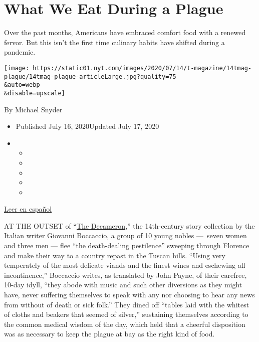 \hypertarget{what-we-eat-during-a-plague}{%
\section{What We Eat During a
Plague}\label{what-we-eat-during-a-plague}}

Over the past months, Americans have embraced comfort food with a
renewed fervor. But this isn't the first time culinary habits have
shifted during a pandemic.

\texttt{[image: https://static01.nyt.com/images/2020/07/14/t-magazine/14tmag-plague/14tmag-plague-articleLarge.jpg?quality=75\\\&auto=webp\\\&disable=upscale]}

By Michael Snyder

\begin{itemize}
\item
  Published July 16, 2020Updated July 17, 2020
\item
  \begin{itemize}
  \item
  \item
  \item
  \item
  \item
  \end{itemize}
\end{itemize}

\href{https://www.nytimes.com/es/2020/07/23/t-magazine/comida-pandemia.html}{Leer
en español}

AT THE OUTSET of
``\href{https://www.nytimes.com/interactive/2020/07/07/magazine/decameron-project-short-story-collection.html}{The
Decameron},'' the 14th-century story collection by the Italian writer
Giovanni Boccaccio, a group of 10 young nobles ---~seven women and three
men --- flee ``the death-dealing pestilence'' sweeping through Florence
and make their way to a country repast in the Tuscan hills. ``Using very
temperately of the most delicate viands and the finest wines and
eschewing all incontinence,'' Boccaccio writes, as translated by John
Payne, of their carefree, 10-day idyll, ``they abode with music and such
other diversions as they might have, never suffering themselves to speak
with any nor choosing to hear any news from without of death or sick
folk.'' They dined off ``tables laid with the whitest of cloths and
beakers that seemed of silver,'' sustaining themselves according to the
common medical wisdom of the day, which held that a cheerful disposition
was as necessary to keep the plague at bay as the right kind of food.

